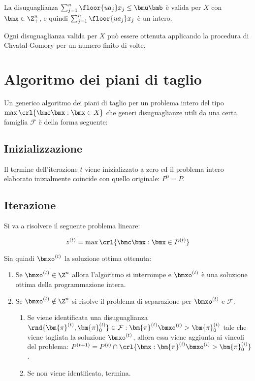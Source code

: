 \documentclass[\main/main.tex]{subfiles}
\begin{document}
La disuguaglianza \(\sum_{j=1}^n \floor{ua_j} x_j \leq \bmu\bmb \) è valida per \(X\) con \(\bmx \in \Z^n_+\), e quindi \(\sum_{j=1}^n \floor{ua_j} x_j\) è un intero.

\begin{theorem}
    Ogni disuguaglianza valida per \(X\) può essere ottenuta applicando la procedura di Chvatal-Gomory per un numero finito di volte.
\end{theorem}

\section{Algoritmo dei piani di taglio}
Un generico algoritmo dei piani di taglio per un problema intero del tipo \(\max\crl{\bmc\bmx: \bmx \in X}\) che generi disuguaglianze utili da una certa famiglia \(\mathcal{F}\) è della forma seguente:

\subsection{Inizializzazione}
Il termine dell'iterazione \(t\) viene inizializzato a zero ed il problema intero elaborato inizialmente coincide con quello originale: \(P^0 = P\).

\subsection{Iterazione}
Si va a risolvere il seguente problema lineare:

\[
    \bar{z}^{(t)} = \max\crl{\bmc\bmx: \bmx \in P^{(t)}}
\]

Sia quindi \(\bmxo^{(t)}\) la soluzione ottima ottenuta:

\begin{enumerate}
    \item Se \(\bmxo^{(t)} \in \Z^n\) allora l'algoritmo si interrompe e \(\bmxo^{(t)}\) è una soluzione ottima della programmazione intera.
    \item Se \(\bmxo^{(t)} \notin \Z^n\) si risolve il problema di separazione per \(\bmxo^{(t)}\) e \(\mathcal{F}\).
    \begin{enumerate}
        \item Se viene identificata una disuguaglianza \(\rnd{\bm{\pi}^{(t)}, \bm{\pi}^{(t)}_0} \in \mathcal{F}: \bm{\pi}^{(t)}\bmxo^{(t)} > \bm{\pi}^{(t)}_0\) tale che viene tagliata la soluzione \(\bmxo^{(t)}\), allora essa viene aggiunta ai vincoli del problema: \(P^{(t+1)} = P^{(t)} \cap \crl{\bmx: \bm{\pi}^{(i)}\bmxo^{(i)} > \bm{\pi}^{(i)}_0} \).
        \item Se non viene identificata, termina.
    \end{enumerate}
\end{enumerate}
\end{document}
